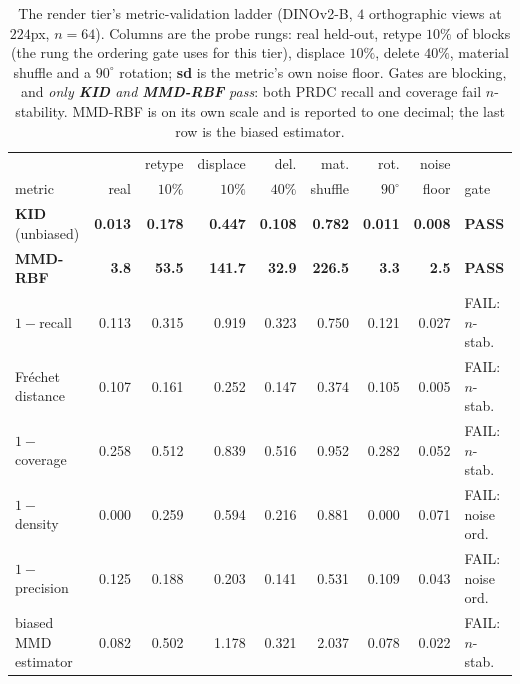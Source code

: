 \begin{table}[t]
\centering
\small
\caption{The render tier's metric-validation ladder (DINOv2-B, $4$ orthographic
views at $224$px, $n{=}64$). Columns are the probe rungs: real held-out, retype
$10\%$ of blocks (the rung the ordering gate uses for this tier), displace
$10\%$, delete $40\%$, material shuffle and a $90^\circ$ rotation; \textbf{sd}
is the metric's own noise floor. Gates are blocking, and \emph{only \textbf{KID}
and \textbf{MMD-RBF} pass}: both PRDC recall and coverage fail $n$-stability.
MMD-RBF is on its own scale and is reported to one decimal; the last row is the
biased estimator.}
\label{tab:ladder-render}
\setlength{\tabcolsep}{3.5pt}
\begin{tabular}{lrrrrrrrl}
\toprule
       &      & retype   & displace & del.    & mat.    & rot.            & noise &      \\
metric & real & $10\%$ & $10\%$ & $40\%$ & shuffle & $90^\circ$ & floor & gate \\
\midrule
\textbf{KID} (unbiased) & \textbf{0.013} & \textbf{0.178} & \textbf{0.447} & \textbf{0.108} & \textbf{0.782} & \textbf{0.011} & \textbf{0.008} & \textbf{PASS} \\
\textbf{MMD-RBF} & \textbf{3.8} & \textbf{53.5} & \textbf{141.7} & \textbf{32.9} & \textbf{226.5} & \textbf{3.3} & \textbf{2.5} & \textbf{PASS} \\
$1-$recall & 0.113 & 0.315 & 0.919 & 0.323 & 0.750 & 0.121 & 0.027 & FAIL: $n$-stab. \\
Fr\'echet distance & 0.107 & 0.161 & 0.252 & 0.147 & 0.374 & 0.105 & 0.005 & FAIL: $n$-stab. \\
$1-$coverage & 0.258 & 0.512 & 0.839 & 0.516 & 0.952 & 0.282 & 0.052 & FAIL: $n$-stab. \\
$1-$density & 0.000 & 0.259 & 0.594 & 0.216 & 0.881 & 0.000 & 0.071 & FAIL: noise ord. \\
$1-$precision & 0.125 & 0.188 & 0.203 & 0.141 & 0.531 & 0.109 & 0.043 & FAIL: noise ord. \\
biased MMD estimator & 0.082 & 0.502 & 1.178 & 0.321 & 2.037 & 0.078 & 0.022 & FAIL: $n$-stab. \\
\bottomrule
\end{tabular}
\end{table}


